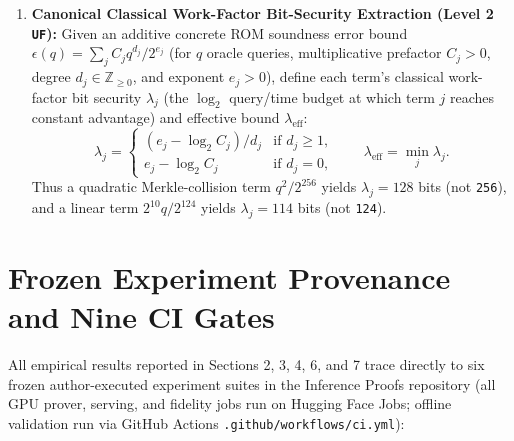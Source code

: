 \documentclass[11pt,letterpaper]{article}
\begin{document}
\begin{enumerate}
\item \textbf{Canonical Classical Work-Factor Bit-Security Extraction (Level 2 \texttt{UF}):} Given an additive concrete ROM soundness error bound $\epsilon(q) = \sum_j C_j q^{d_j} / 2^{e_j}$ (for $q$ oracle queries, multiplicative prefactor $C_j > 0$, degree $d_j \in \mathbb{Z}_{\ge 0}$, and exponent $e_j > 0$), define each term's classical work-factor bit security $\lambda_j$ (the $\log_2$ query/time budget at which term $j$ reaches constant advantage) and effective bound $\lambda_{\text{eff}}$:
\[
\lambda_j = \begin{cases} (e_j - \log_2 C_j) / d_j & \text{if } d_j \ge 1, \\ e_j - \log_2 C_j & \text{if } d_j = 0, \end{cases} \qquad \lambda_{\text{eff}} = \min_j \lambda_j.
\] Thus a quadratic Merkle-collision term $q^2/2^{256}$ yields $\lambda_j = 128$ bits (not \texttt{256}), and a linear term $2^{10} q / 2^{124}$ yields $\lambda_j = 114$ bits (not \texttt{124}).
\end{enumerate}

\section{Frozen Experiment Provenance and Nine CI Gates}

All empirical results reported in Sections 2, 3, 4, 6, and 7 trace directly to six frozen author-executed experiment suites in the Inference Proofs repository (all GPU prover, serving, and fidelity jobs run on Hugging Face Jobs; offline validation run via GitHub Actions \texttt{.\allowbreak{}github/\allowbreak{}workflows/\allowbreak{}ci.\allowbreak{}yml}):
\end{document}
